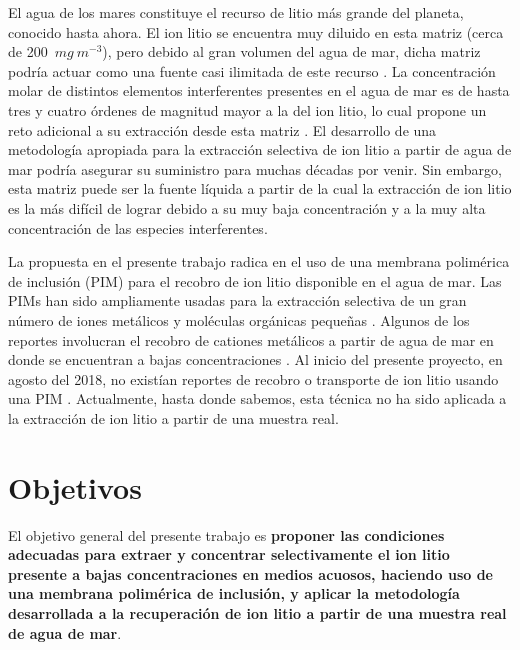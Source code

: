 El agua de los mares constituye el recurso de litio más grande del planeta, conocido hasta ahora. El ion litio se encuentra muy diluido en esta matriz (cerca de 200~$mg~m^{-3}$), pero debido al gran volumen del agua de mar, dicha matriz podría actuar como una fuente casi ilimitada de este recurso \citep{Yang2018}. La concentración molar de distintos elementos interferentes presentes en el agua de mar es de hasta tres y cuatro órdenes de magnitud mayor a la del ion litio, lo cual propone un reto adicional a su extracción desde esta matriz \citep{LI2019117317}. El desarrollo de una metodología apropiada para la extracción selectiva de ion litio a partir de agua de mar podría asegurar su suministro para muchas décadas por venir. Sin embargo, esta matriz puede ser la fuente líquida a partir de la cual la extracción de ion litio es la más difícil de lograr debido a su muy baja concentración y a la muy alta concentración de las especies interferentes.

La propuesta en el presente trabajo radica en el uso de una membrana polimérica de inclusión (PIM) para el recobro de ion litio disponible en el agua de mar. Las \ac{PIM}s han sido ampliamente usadas para la extracción selectiva de un gran número de iones metálicos y moléculas orgánicas pequeñas \citep{Nghiem2006}. Algunos de los reportes involucran el recobro de cationes metálicos a partir de agua de mar en donde se encuentran a bajas concentraciones \citep{Pont2008, Scindia2005}. Al inicio del presente proyecto, en agosto del 2018, no existían reportes de recobro o transporte de ion litio usando una PIM \citep{Cai2019}. Actualmente, hasta donde sabemos, esta técnica no ha sido aplicada a la extracción de ion litio a partir de una muestra real.

\section{Objetivos}
El objetivo general del presente trabajo es \textbf{proponer las condiciones adecuadas para extraer y concentrar selectivamente el ion litio presente a bajas concentraciones en medios acuosos, haciendo uso de una membrana polimérica de inclusión, y aplicar la metodología desarrollada a la recuperación de ion litio a partir de una muestra real de agua de mar}.

